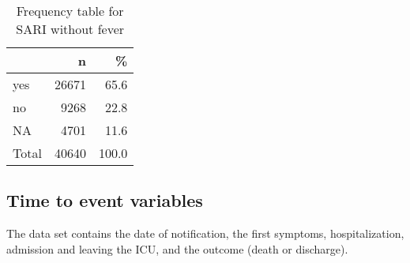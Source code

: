 \documentclass[
]{article}
\newenvironment{Shaded}{\begin{snugshade}}{\end{snugshade}}
\newcommand{\DataTypeTok}[1]{\textcolor[rgb]{0.13,0.29,0.53}{#1}}
\newcommand{\DecValTok}[1]{\textcolor[rgb]{0.00,0.00,0.81}{#1}}
\newcommand{\KeywordTok}[1]{\textcolor[rgb]{0.13,0.29,0.53}{\textbf{#1}}}
\newcommand{\NormalTok}[1]{#1}
\newcommand{\OperatorTok}[1]{\textcolor[rgb]{0.81,0.36,0.00}{\textbf{#1}}}
\newcommand{\OtherTok}[1]{\textcolor[rgb]{0.56,0.35,0.01}{#1}}
\newcommand{\StringTok}[1]{\textcolor[rgb]{0.31,0.60,0.02}{#1}}
\begin{document}
\begin{Shaded}
\end{Shaded}

\begin{table}[!h]

\caption{\label{tab:unnamed-chunk-86}Frequency table for SARI without fever}
\centering
\begin{tabular}[t]{l|r|r}
\hline
  & n & \%\\
\hline
yes & 26671 & 65.6\\
\hline
no & 9268 & 22.8\\
\hline
NA & 4701 & 11.6\\
\hline
Total & 40640 & 100.0\\
\hline
\end{tabular}
\end{table}

\hypertarget{time-to-event-variables}{%
\subsection{Time to event variables}\label{time-to-event-variables}}

The data set contains the date of notification, the first symptoms,
hospitalization, admission and leaving the ICU, and the outcome (death
or discharge).
\end{document}
